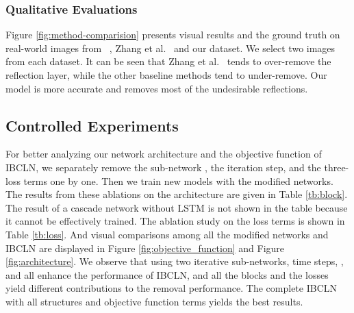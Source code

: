 \documentclass[10pt,twocolumn,letterpaper]{article}
\begin{document}
\vspace{-0.5em}
\subsubsection{Qualitative Evaluations}
Figure \ref{fig:method-comparision} presents visual results and the ground truth on real-world images from ~\cite{wan2017benchmarking}, Zhang et al.~\cite{zhang2018single} and our dataset. We select two images from each dataset. It can be seen that Zhang et al.~\cite{zhang2018single} tends to over-remove the reflection layer, while the other baseline methods tend to under-remove. Our model is more accurate and removes most of the undesirable reflections.

\vspace{-0.2em}
\subsection{Controlled Experiments}
For better analyzing our network architecture and the objective function of IBCLN, we separately remove the sub-network , the iteration step, and the three-loss terms one by one. Then we train new models with the modified networks. The results from these ablations on the architecture are given in Table \ref{tb:block}. The result of a cascade network without LSTM is not shown in the table because it cannot be effectively trained. The ablation study on the loss terms is shown in Table \ref{tb:loss}. And visual comparisons among all the modified networks and IBCLN are displayed in Figure \ref{fig:objective_function} and Figure \ref{fig:architecture}. We observe that using two iterative sub-networks, time steps, ,  and  all enhance the performance of IBCLN, and all the blocks and the losses yield different contributions to the removal performance. The complete IBCLN with all structures and objective function terms yields the best results.
\end{document}
